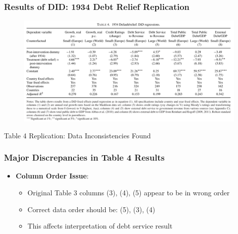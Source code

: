 \documentclass{beamer}
\begin{document}
\begin{frame}
    \frametitle{Results of DID: 1934 Debt Relief Replication}
  \begin{figure}[ht!]
      \centering
      \includegraphics[width=0.95\linewidth]{figures/tab4.png}
      \label{fig:tab4}
  \end{figure}  
\end{frame}

\begin{frame}{Table 4 Replication: Data Inconsistencies Found}
  \frametitle{Major Discrepancies in Table 4 Results}
  \begin{itemize}
    \item \textbf{Column Order Issue}:
    \begin{itemize}
        \item Original Table 3 columns (3), (4), (5) appear to be in wrong order
        \item Correct data order should be: (5), (3), (4)
        \item This affects interpretation of debt service result
    \end{itemize}
  \end{itemize}
\end{frame}
\end{document}

